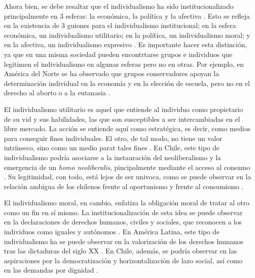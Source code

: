\documentclass[12pt,twoside]{templates/facsothesis}
\begin{document}
Ahora bien, se debe resaltar que el individualismo ha sido institucionalizado principalmente en 3 esferas: la económica, la política y la afectiva \citep{cortois2018, martuccelli2018}. Esto se refleja en la existencia de 3 guiones para el individualismo institucional; en la esfera económica, un individualismo utilitario; en la política, un individualismo moral; y en la afectiva, un individualismo expresivo \citep{cortois2018}. Es importante hacer esta distinción, ya que en una misma sociedad pueden encontrtarse grupos e individuos que legitimen el individualismo en algunas esferas pero no en otras. Por ejemplo, en América del Norte se ha observado que grupos conservadores apoyan la determinación individual en la economía y en la elección de escuela, pero no en el derecho al aborto o a la eutanasia \citep{kemmelmeier2003}.

El individualismo utilitario es aquel que entiende al individuo como propietario de su vid y sus habilidades, las que son susceptibles a ser intercambiadas en el libre mercado. La acción se entiende aquí como estratégica, es decir, como medios para conseguir fines individuales. El otro, de tal modo, no tiene un valor intrínseco, sino como un medio parat tales fines \citep{cortois2018}. En Chile, este tipo de individualismo podría asociarse a la instauración del neoliberalismo y la emergencia de un \emph{homo neoliberalis}, pincipalmente mediante el acceso al consumo \citep{araujo2012, araujo2020a}. Su legitimidad, con todo, está lejos de ser univoca, como se puede observar en la relación ambigua de los chilenos frente al oportunismo \citep{araujo2014} y frente al consumismo \citep{araujo2012}.

El individualismo moral, en cambio, enfatiza la obligación moral de tratar al otro como un fin en sí mismo. La institucionalización de esta idea se puede observar en la declaraciones de derechos humanos, civiles y sociales, que reconocen a los individuos como iguales y autónomos \citep{cortois2018}. En América Latina, este tipo de individualismo ha se puede observar en la valorización de los derechos humanos tras las dictaduras del siglo XX \citep{araujo2020a}. En Chile, además, se podría observar en las aspiraciones por la democratización y horizontalización de lazo social, así como en las demandas por dignidad \citep{araujo2012}.
\end{document}
